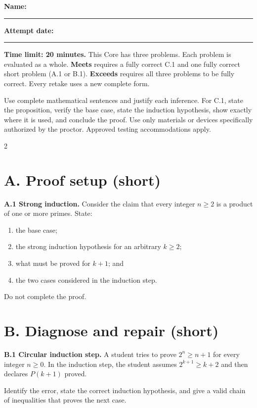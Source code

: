\documentclass[11pt]{article}
\begin{document}
\begin{tcolorbox}
\small
\textbf{Name:} \rule{2.55in}{0.4pt}\hfill
\textbf{Attempt date:} \rule{1.45in}{0.4pt}

\vspace{3pt}
\textbf{Time limit: 20 minutes.} This Core has three problems. Each problem is
evaluated as a whole. \textbf{Meets} requires a fully correct C.1 and one fully
correct short problem (A.1 or B.1). \textbf{Exceeds} requires all three
problems to be fully correct. Every retake uses a new complete form.

\vspace{3pt}
Use complete mathematical sentences and justify each inference. For C.1, state
the proposition, verify the base case, state the induction hypothesis, show
exactly where it is used, and conclude the proof. Use only materials or devices
specifically authorized by the proctor. Approved testing accommodations apply.
\end{tcolorbox}

\begin{multicols}{2}

\section*{A. Proof setup (short)}
\textbf{A.1 Strong induction.}
Consider the claim that every integer $n\ge2$ is a product of one or more
primes. State:
\begin{enumerate}[label=(\alph*)]
  \item the base case;
  \item the strong induction hypothesis for an arbitrary $k\ge2$;
  \item what must be proved for $k+1$; and
  \item the two cases considered in the induction step.
\end{enumerate}
Do not complete the proof.

\begin{responsebox}[A.1 response]
\vspace{1.45in}
\end{responsebox}

\columnbreak

\section*{B. Diagnose and repair (short)}
\textbf{B.1 Circular induction step.}
A student tries to prove $2^n\ge n+1$ for every integer $n\ge0$. In the
induction step, the student assumes $2^{k+1}\ge k+2$ and then declares
$P(k+1)$ proved.

Identify the error, state the correct induction hypothesis, and give a valid
chain of inequalities that proves the next case.

\begin{responsebox}[B.1 response]
\vspace{1.72in}
\end{responsebox}

\end{multicols}
\end{document}
